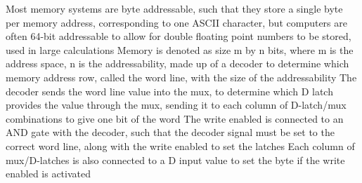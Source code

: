 \documentclass[11 pt, twoside]{article}
\newenvironment{outline*}
{
	\begin{outline}[enumerate]
	}
	{\end{outline}
}
\begin{document}
\begin{outline*}
\2 Most memory systems are byte addressable, such that they store a single byte per memory address, corresponding to one ASCII character, but computers are often 64-bit addressable to allow for double floating point numbers to be stored, used in large calculations
\1 Memory is denoted as size m by n bits, where m is the address space, n is the addressability, made up of a decoder to determine which memory address row, called the word line, with the size of the addressability
\2 The decoder sends the word line value into the mux, to determine which D latch provides the value through the mux, sending it to each column of D-latch/mux combinations to give one bit of the word
\2 The write enabled is connected to an AND gate with the decoder, such that the decoder signal must be set to the correct word line, along with the write enabled to set the latches
\2 Each column of mux/D-latches is also connected to a D input value to set the byte if the write enabled is activated
\end{outline*}
\end{document}
